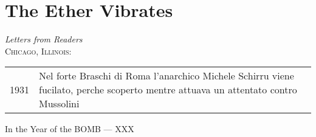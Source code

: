 \documentclass[12pt, onecolumn, letterpaper, oneside]{book}
\begin{document}
\chapter{The Ether Vibrates}
\vspace{-1cm}
\emph{Letters from Readers}\\

\noindent \textsc{Chicago, Illinois:}\\

\begin{flushright} 
\begin{tabular}{l p{8cm}}
1931 & Nel forte Braschi di Roma l'anarchico Michele Schirru viene fucilato, perche scoperto mentre attuava un attentato contro Mussolini
\end{tabular}

In the Year of the BOMB --- XXX\\ \end{flushright}
\end{document}
